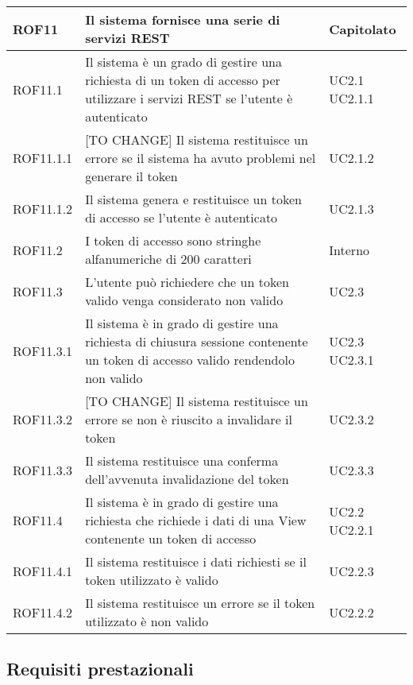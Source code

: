 \begin{center}
\begin{longtable}{| p{2cm} | p{8cm} | p{2cm} |}
		ROF11  &  Il sistema fornisce una serie di servizi REST  & Capitolato \\
		\hline
		ROF11.1  &  Il sistema è un grado di gestire una richiesta di un token di accesso per utilizzare i servizi REST se l'utente è autenticato  & UC2.1 \newline UC2.1.1 \\
		\hline
		ROF11.1.1  &  [TO CHANGE] Il sistema restituisce un errore se il sistema ha avuto problemi nel generare il token & UC2.1.2 \\
		\hline
		ROF11.1.2  &  Il sistema genera e restituisce un token di accesso se l'utente è autenticato  & UC2.1.3 \\
		\hline
		ROF11.2  &  I token di accesso sono stringhe alfanumeriche di 200 caratteri  & Interno \\
		\hline
		ROF11.3  &  L'utente può richiedere che un token valido venga considerato non valido  & UC2.3 \\
		\hline
		ROF11.3.1  &  Il sistema è in grado di gestire una richiesta di chiusura sessione contenente un token di accesso valido rendendolo non valido & UC2.3 \newline UC2.3.1 \\
		\hline
		ROF11.3.2  &  [TO CHANGE] Il sistema restituisce un errore se non è riuscito a invalidare il token & UC2.3.2 \\
		\hline
		ROF11.3.3  &  Il sistema restituisce una conferma dell'avvenuta invalidazione del token & UC2.3.3 \\
		\hline
		ROF11.4  &  Il sistema è in grado di gestire una richiesta che richiede i dati di una View contenente un token di accesso  &  UC2.2 \newline UC2.2.1 \\
		\hline
		ROF11.4.1  &  Il sistema restituisce i dati richiesti se il token utilizzato è valido  &  UC2.2.3 \\
		\hline
		ROF11.4.2  &  Il sistema restituisce un errore se il token utilizzato è non valido  &  UC2.2.2 \\
		\hline

	\end{longtable}
	\egroup
\end{center}


\subsection{Requisiti prestazionali}

